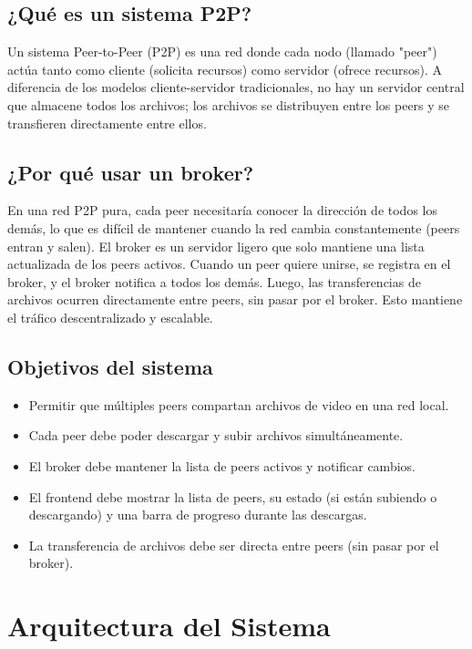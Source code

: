 \documentclass[12pt]{article}
\begin{document}
\subsection{¿Qué es un sistema P2P?}
Un sistema Peer-to-Peer (P2P) es una red donde cada nodo (llamado "peer") actúa tanto como cliente (solicita recursos) como servidor (ofrece recursos). A diferencia de los modelos cliente-servidor tradicionales, no hay un servidor central que almacene todos los archivos; los archivos se distribuyen entre los peers y se transfieren directamente entre ellos.

\subsection{¿Por qué usar un broker?}
En una red P2P pura, cada peer necesitaría conocer la dirección de todos los demás, lo que es difícil de mantener cuando la red cambia constantemente (peers entran y salen). El broker es un servidor ligero que solo mantiene una lista actualizada de los peers activos. Cuando un peer quiere unirse, se registra en el broker, y el broker notifica a todos los demás. Luego, las transferencias de archivos ocurren directamente entre peers, sin pasar por el broker. Esto mantiene el tráfico descentralizado y escalable.

\subsection{Objetivos del sistema}
\begin{itemize}
    \item Permitir que múltiples peers compartan archivos de video en una red local.
    \item Cada peer debe poder descargar y subir archivos simultáneamente.
    \item El broker debe mantener la lista de peers activos y notificar cambios.
    \item El frontend debe mostrar la lista de peers, su estado (si están subiendo o descargando) y una barra de progreso durante las descargas.
    \item La transferencia de archivos debe ser directa entre peers (sin pasar por el broker).
\end{itemize}

\section{Arquitectura del Sistema}
\end{document}
